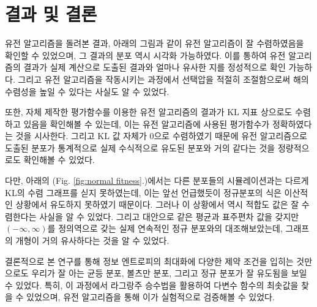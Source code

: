\section{결과 및 결론}

유전 알고리즘을 돌려본 결과, 아래의 그림과 같이 유전 알고리즘이 잘 수렴하였음을 확인할 수 있었으며, 그 결과의 분포 역시 시각화 가능하였다. 이를 통하여 유전 알고리즘의 결과가 실제 계산으로 도출된 결과와 얼마나 유사한 지를 정성적으로 확인 가능하다. 그리고 유전 알고리즘을 작동시키는 과정에서 선택압을 적절히 조절함으로써 해의 수렴성을 높일 수 있다는 사실도 알 수 있었다.

또한, 자체 제작한 평가함수를 이용한 유전 알고리즘의 결과가 KL 지표 상으로도 수렴하고 있음을 확인해볼 수 있는데, 이는 유전 알고리즘에 사용된 평가함수가 정확하였다는 것을 시사한다. 그리고 KL 값 자체가 0으로 수렴하였기 때문에 유전 알고리즘으로 도출된 분포가 통계적으로 실제 수식적으로 유도된 분포와 거의 같다는 것을 정량적으로도 확인해볼 수 있었다. 

다만, 아래의 (Fig. \ref{fig:normal fitness}.)에서는 다른 분포들의 시뮬레이션과는 다르게 KL의 수렴 그래프를 싣지 못하였는데, 이는 앞선 언급했듯이 정규분포의 식은 이산적인 상황에서 유도하지 못하였기 때문이다. 그러나 이 상황에서 역시 적합도 값은 잘 수렴한다는 사실을 알 수 있었다. 그리고 대안으로 같은 평균과 표주편차 값을 갖지만 $(-\infty, \infty)$를 정의역으로 갖는 실제 연속적인 정규 분포와의 대조해보았는데, 그래프의 개형이 거의 유사하다는 것을 알 수 있었다.

결론적으로 본 연구를 통해 정보 엔트로피의 최대화에 다양한 제약 조건을 입히는 것만으로도 우리가 잘 아는 균등 분포, 볼츠만 분포, 그리고 정규 분포가 잘 유도됨을 보일 수 있었다. 특히, 이 과정에서 라그랑주 승수법을 활용하여 다변수 함수의 최솟값을 찾을 수 있었으며, 유전 알고리즘을 통해 이가 실험적으로 검증해볼 수 있었다.

